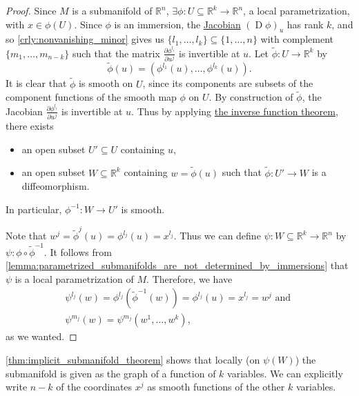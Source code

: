 \documentclass[notoc,notitlepage]{tufte-book}
\DeclareMathOperator{\D}{D}
\begin{document}
\begin{proof}
  Since $M$ is a submanifold of $\mathbb{R}^n$, $\exists \phi : U \subseteq
  \mathbb{R}^k \to \mathbb{R}^n$, a local parametrization, with $x \in \phi(U)$.
  Since $\phi$ is an immersion, the \hyperref[defn:differential]{Jacobian} $(\D
  \phi)_u$ has rank $k$, and so \cref{crly:nonvanishing_minor} gives us $\{ l_1,
  \ldots, l_k \} \subseteq \{ 1, \ldots, n \}$ with complement $\{ m_1,
  \ldots, m_{n - k} \}$ such that the matrix $\frac{\partial \phi^{l_i}}{\partial
  u^j}$ is invertible at $u$. Let $\tilde{\phi} : U \to \mathbb{R}^k$ by
  \begin{equation*}
    \tilde{\phi}(u) = (\phi^{l_1}(u), \ldots, \phi^{l_k}(u)).
  \end{equation*}
  It is clear that $\tilde{\phi}$ is smooth on $U$, since its components are
  subsets of the component functions of the smooth map $\phi$ on $U$. By
  construction of $\tilde{\phi}$, the Jacobian $\frac{\partial
  \phi^{l_i}}{\partial u^j}$ is invertible at $u$. Thus by applying
  \hyperref[thm:inverse_function_theorem]{the inverse function theorem}, there
  exists
  \begin{itemize}
    \item an open subset $U' \subseteq U$ containing $u$,
    \item an open subset $W \subseteq \mathbb{R}^k$ containing $w =
      \tilde{\phi}(u)$ such that $\tilde{\phi} : U' \to W$ is a diffeomorphism.
  \end{itemize}
  In particular, $\phi^{-1} : W \to U'$ is smooth.

  Note that $w^j = \tilde{\phi}^j(u) = \phi^{l_j}(u) = x^{l_j}$. Thus we can
  define $\psi : W \subseteq \mathbb{R}^k \to \mathbb{R}^n$ by $\psi : \phi
  \circ \tilde{\phi}^{-1}$. It follows from
  \cref{lemma:parametrized_submanifolds_are_not_determined_by_immersions} that
  $\psi$ is a local parametrization of $M$. Therefore, we have
  \begin{gather*}
    \psi^{l_j}(w) = \phi^{l_j} ( \tilde{\phi}^{-1}(w) ) = \phi^{l_j}(u) =
    x^{l_j} = w^j \text{ and } \\
    \psi^{m_j}(w) = \psi^{m_j}(w^1, \ldots, w^k),
  \end{gather*}
  as we wanted.
\end{proof}

\begin{note}
  \cref{thm:implicit_submanifold_theorem} shows that locally (on $\psi(W)$) the
  submanifold is given as the graph of a function of $k$ variables. We can
  explicitly write $n - k$ of the coordinates $x^j$ as smooth functions of the
  other $k$ variables.
\end{note}
\end{document}
